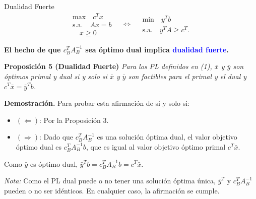 \documentclass{beamer}
\begin{document}
\begin{frame}{Dualidad Fuerte}
    \[
    \begin{array}{c}
    \text{max} \quad c^T x \\
    \text{s.a.} \quad Ax = b \\
    \quad x \geq 0
    \end{array}
    \quad \Leftrightarrow \quad
    \begin{array}{c}
    \text{min} \quad y^T b \\
    \text{s.a.} \quad y^T A \geq c^T.
    \end{array}
    \]

    \vspace{0.3cm}
    \textbf{El hecho de que \( c_B^T A_B^{-1} \) sea óptimo dual implica \textcolor{blue}{dualidad fuerte}.}

    \vspace{0.5cm}
    \begin{block}{\textbf{Proposición 5 (Dualidad Fuerte)}}
        \textit{Para los PL definidos en (1), \(\bar{x}\) y \(\bar{y}\) son óptimos primal y dual si y solo si \(\bar{x}\) y \(\bar{y}\) son factibles para el primal y el dual y \( c^T \bar{x} = \bar{y}^T b \).}
    \end{block}

    \vspace{0.3cm}
    \textbf{Demostración.} Para probar esta afirmación de si y solo si:

    \begin{itemize}
        \item \((\Leftarrow)\): Por la Proposición 3.
        \item \((\Rightarrow)\): Dado que \( c_B^T A_B^{-1} \) es una solución óptima dual, el valor objetivo óptimo dual es \( c_B^T A_B^{-1} b \), que es igual al valor objetivo óptimo primal \( c^T \bar{x} \).
    \end{itemize}

    \vspace{0.3cm}
    Como \(\bar{y}\) es óptimo dual, \(\bar{y}^T b = c_B^T A_B^{-1} b = c^T \bar{x}\).

    \vspace{0.5cm}
    \textit{Nota:} Como el PL dual puede o no tener una solución óptima única, \(\bar{y}^T\) y \( c_B^T A_B^{-1} \) pueden o no ser idénticos. En cualquier caso, la afirmación se cumple.
\end{frame}
\end{document}
